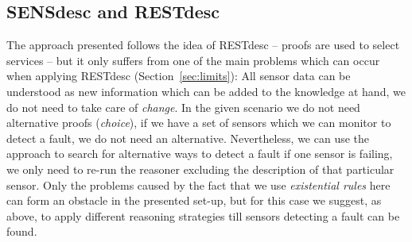 \subsection{SENSdesc and RESTdesc}
% 
% 
% 
The approach presented follows the idea of RESTdesc -- proofs are used to select services -- but it only suffers from one of the main problems which can 
occur when applying RESTdesc
(Section~\ref{sec:limits}):
All sensor data can be understood as new information which can be added to the knowledge at hand, we do not need to take care of \emph{change}. 
In the given scenario we do not need alternative proofs (\emph{choice}), if we have a set of sensors which we can monitor to detect a fault, we do not need an alternative. 
Nevertheless, we can use the approach to search for alternative ways to detect a fault if one sensor is failing, we only need to re-run the reasoner excluding 
the description of that particular sensor. Only the problems caused by the fact that we use \emph{existential rules} here can form an obstacle in the presented set-up, but for 
this case we suggest, as above, to apply different reasoning strategies till sensors detecting a fault can be found.

